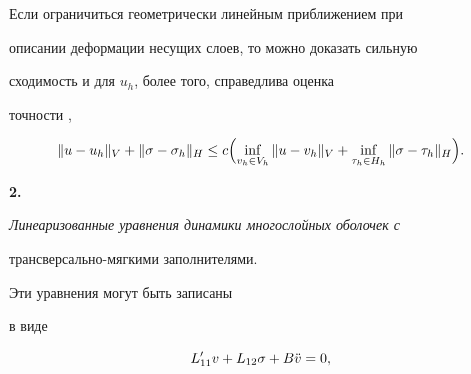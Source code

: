 




\begin{note}


Если ограничиться геометрически линейным приближением при


описании деформации несущих слоев, то можно доказать сильную 


сходимость и для $u_h$, более того, справедлива оценка 


точности \cite{Kar2}, \cite{Kar3}


$$


\|u - u_h \|_V + \| \sigma - \sigma_h \|_H \le


c \Bigl (


\inf \limits _{v_h \in V_h} \|u - v_h \|_V + 


\inf \limits _{\tau_h \in H_h}


\| \sigma - \tau_h \|_H 


 \Bigr ).


$$


\end{note}





{\bf 2.} {\it Линеаризованные уравнения динамики многослойных оболочек с


трансверсально-мягкими заполнителями.} Эти уравнения могут быть записаны


в виде \cite{Iva}


$$


L'_{11}v + L_{12} \sigma + B \Ddot v = 0,


$$


$$


